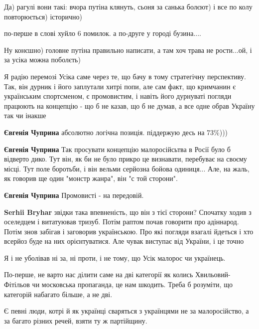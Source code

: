 \begin{itemize}
\begin{itemize}
Да) рагулі вони такі: вчора путіна клянуть, сьоня за санька болєют) і все по колу повторюється) історично)

по-перше в слові хуйло 6 помилок. а по-друге у городі бузина....

Ну конєшно) головне путіна правильно написати, а там хоч трава не рости...ой, і за усіка можна поболєть)
\end{itemize} %


Я радію перемозі Усіка саме через те, що бачу в тому стратегічну перспективу.
Так, він дурник і його заплутали хитрі попи, але сам факт, що кримчанин є
українським спортсменом, є промовистим, і навіть його дурнуваті погляди
працюють на концепцію - що б не казав, що б не думав, а все одне обрав Україну
так чи інакше

\begin{itemize} %
\textbf{Євгенія Чуприна} абсолютно логічна позиція. піддержую десь на 73\%)))

\textbf{Євгенія Чуприна} Так просувати концепцію малоросійсьтва в Росії було б відверто дико. Тут він, як би не було прикро це визнавати, перебуває на своєму місці. Тут поле боротьби, і він вельми серйозна бойова одиниця... Але, на жаль, як говорив ще один "монстр жанра", він "с той сторони".

\textbf{Євгенія Чуприна}
Промовисті - на передовій.

\textbf{Serhii Bryhar} звідки така впевненість, що він з тієї сторони? Спочатку ходив з оселедцем і витатуював тризуб. Потім раптом почав говорити про адіннарод. Потім знов забігав і заговорив українською. Про які погляди взагалі йдеться і хто всерйоз буде на них орієнтуватися. Але чувак виступає від України, і це точно
\end{itemize} %


Я і не уболівав ні за, ні проти, і не тому, що Усік малорос чи українець.

По-перше, не варто нас ділити саме на дві категорії як колись
Хвильовий-Фітільов чи московська пропаганда, це нам шкодить. Треба б розуміти,
що категорій набагато більше, а не дві.

Є певні люди, котрі й як українці сваряться з українцями не за малоросійство, а
за багато різних речей, взяти ту ж партійщину.


\end{itemize}
